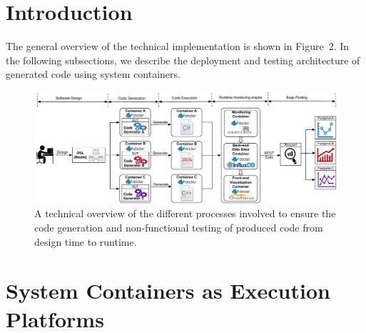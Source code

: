 \section{Introduction}

The general overview of the technical implementation is shown in Figure~2. In the following subsections, we describe the deployment and testing architecture of generated code using system containers.


\begin{figure}[!h]
	\center
	\includegraphics[width=0.95\linewidth]{chapitre5/fig/background2.pdf}
	\caption{A technical overview of the different processes involved to ensure the code generation and non-functional testing of produced code from design time to runtime.}
\end{figure}


\section{System Containers as Execution Platforms}





